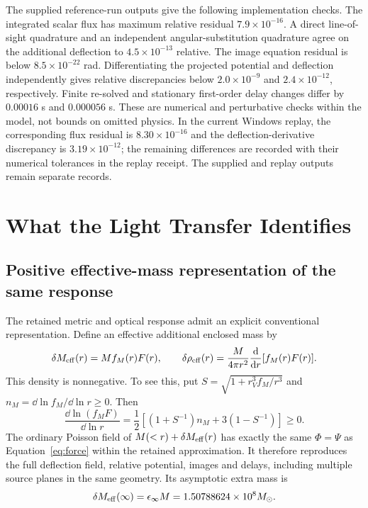 The supplied reference-run outputs give the following implementation checks.
The integrated scalar flux has maximum relative residual
$7.9\times10^{-16}$. A direct line-of-sight quadrature and an independent
angular-substitution quadrature agree on the additional deflection to
$4.5\times10^{-13}$ relative. The image equation residual is below
$8.5\times10^{-22}$ rad. Differentiating the projected potential and
deflection independently gives relative discrepancies below
$2.0\times10^{-9}$ and $2.4\times10^{-12}$, respectively.
Finite re-solved and stationary first-order delay changes differ by
$0.00016$ s and $0.000056$ s. These are numerical and perturbative checks
within the model, not bounds on omitted physics. In the current Windows
replay, the corresponding flux residual is $8.30\times10^{-16}$ and the
deflection-derivative discrepancy is $3.19\times10^{-12}$; the remaining
differences are recorded with their numerical tolerances in the replay
receipt. The supplied and replay outputs remain separate records.

\section{What the Light Transfer Identifies}
\label{sec:degeneracies}
\subsection{Positive effective-mass representation of the same response}
The retained metric and optical response admit an explicit conventional
representation. Define an effective additional enclosed mass by
\begin{equation}
 \delta M_{\rm eff}(r)=M f_M(r)F(r),\qquad
 \delta\rho_{\rm eff}(r)=
 \frac{M}{4\pi r^2}\frac{\mathrm d}{\mathrm d r}[f_M(r)F(r)] .
 \label{eq:halo}
\end{equation}
This density is nonnegative. To see this, put
$S=\sqrt{1+r_V^3f_M/r^3}$ and
$n_M=\dd\ln f_M/\dd\ln r\ge0$. Then
\begin{equation}
 \frac{\dd\ln(f_MF)}{\dd\ln r}
 =\frac12\left[(1+S^{-1})n_M+3(1-S^{-1})\right]\ge0 .
 \label{eq:positive-halo}
\end{equation}
The ordinary Poisson field of
$M(<r)+\delta M_{\rm eff}(r)$ has exactly the same $\Phi=\Psi$
as Equation~\eqref{eq:force} within the retained approximation.
It therefore reproduces the full deflection field, relative potential,
images and delays, including multiple source planes in the same geometry.
Its asymptotic extra mass is
\begin{equation}
 \delta M_{\rm eff}(\infty)=\epsilon_\infty M
 =1.50788624\times10^8M_\odot .
 \label{eq:halo-total}
\end{equation}

